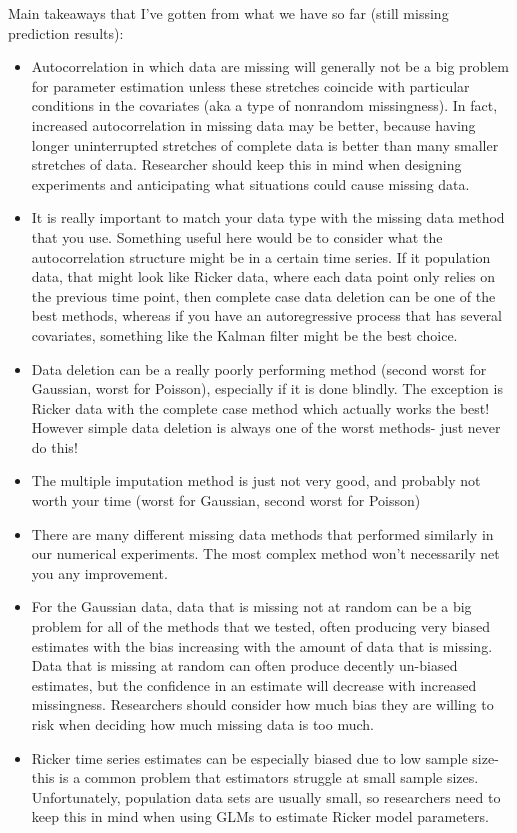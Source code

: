 Main takeaways that I've gotten from what we have so far (still missing prediction results):
\begin{itemize}
    \item Autocorrelation in which data are missing will generally not be a big problem for parameter estimation unless these stretches coincide with particular conditions in the covariates (aka a type of nonrandom missingness). In fact, increased autocorrelation in missing data may be better, because having longer uninterrupted stretches of complete data is better than many smaller stretches of data. Researcher should keep this in mind when designing experiments and anticipating what situations could cause missing data.
    \item It is really important to match your data type with the missing data method that you use. Something useful here would be to consider what the autocorrelation structure might be in a certain time series. If it population data, that might look like Ricker data, where each data point only relies on the previous time point, then complete case data deletion can be one of the best methods, whereas if you have an autoregressive process that has several covariates, something like the Kalman filter might be the best choice.
    \item Data deletion can be a really poorly performing method (second worst for Gaussian, worst for Poisson), especially if it is done blindly. The exception is Ricker data with the complete case method which actually works the best! However simple data deletion is always one of the worst methods- just never do this!
    \item The multiple imputation method is just not very good, and probably not worth your time (worst for Gaussian, second worst for Poisson)
    \item There are many different missing data methods that performed similarly in our numerical experiments. The most complex method won't necessarily net you any improvement.
    \item For the Gaussian data, data that is missing not at random can be a big problem for all of the methods that we tested, often producing very biased estimates with the bias increasing with the amount of data that is missing. Data that is missing at random can often produce decently un-biased estimates, but the confidence in an estimate will decrease with increased missingness. Researchers should consider how much bias they are willing to risk when deciding how much missing data is too much.
    \item Ricker time series estimates can be especially biased due to low sample size- this is a common problem that estimators struggle at small sample sizes. Unfortunately, population data sets are usually small, so researchers need to keep this in mind when using GLMs to estimate Ricker model parameters.
\end{itemize}

